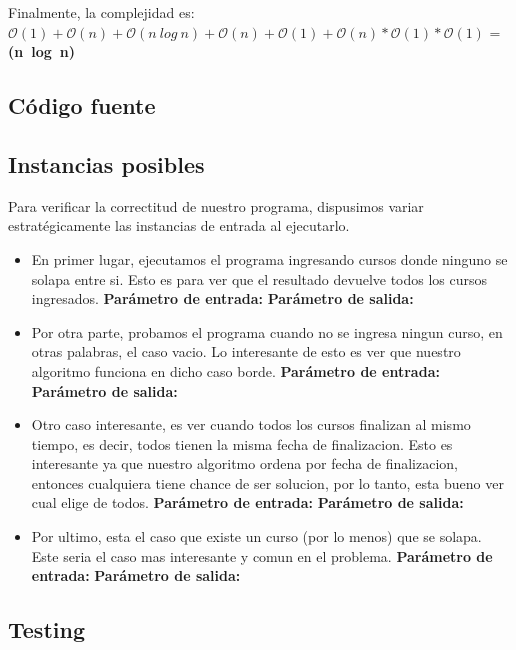 Finalmente, la complejidad es: $\mathcal{O}(1)+\mathcal{O}(n)+\mathcal{O}(n\ log\ n)+\mathcal{O}(n)+\mathcal{O}(1)+\mathcal{O}(n)*\mathcal{O}(1)*\mathcal{O}(1)$ = \textbf{(n\ log\ n)}

\subsection{Código fuente}



\subsection{Instancias posibles}

Para verificar la correctitud de nuestro programa, dispusimos variar estratégicamente las instancias de entrada al ejecutarlo.
\begin{itemize}
\item En primer lugar, ejecutamos el programa ingresando cursos donde ninguno se solapa entre si. Esto es para ver que el resultado devuelve todos los cursos ingresados.\newline
\textbf{Parámetro de entrada:}
\textbf{Parámetro de salida:}\newline
\item Por otra parte, probamos el programa cuando no se ingresa ningun curso, en otras palabras, el caso vacio. Lo interesante de esto es ver que nuestro algoritmo funciona en dicho caso borde.\newline
\textbf{Parámetro de entrada:}
\textbf{Parámetro de salida:}\newline
\item Otro caso interesante, es ver cuando todos los cursos finalizan al mismo tiempo, es decir, todos tienen la misma fecha de finalizacion. Esto es interesante ya que nuestro algoritmo ordena por fecha de finalizacion, entonces cualquiera tiene chance de ser solucion, por lo tanto, esta bueno ver cual elige de todos. \newline
\textbf{Parámetro de entrada:}
\textbf{Parámetro de salida:}\newline
\item Por ultimo, esta el caso que existe un curso (por lo menos) que se solapa. Este seria el caso mas interesante y comun en el problema. \newline
\textbf{Parámetro de entrada:}
\textbf{Parámetro de salida:}\newline
\end{itemize}



\subsection{Testing}
